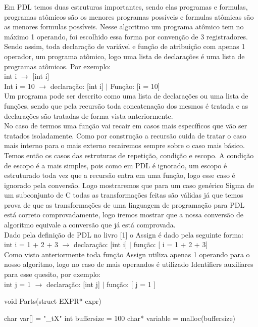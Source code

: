 \documentclass{article}
\begin{document}
Em PDL temos duas estruturas importantes, sendo elas programas e formulas, programas atômicos são os menores programas possíveis e formulas atômicas são as menores formulas possíveis. Nesse algoritmo um programa atômico tem no máximo 1 operando, foi escolhido essa forma por convenção de 3 registradores. Sendo assim, toda declaração de variável e função de atribuição com apenas 1 operador, um programa atômico, logo uma lista de declarações é uma lista de programas atômicos. Por exemplo:\\
\BlankLine
int i $\rightarrow$ [int i] \\
\BlankLine
Int i = 10 $\rightarrow$ declaração: [int i] $|$ Função: [i = 10] \\
\BlankLine
Um programa pode ser descrito como uma lista de declarações ou uma lista de funções, sendo que pela recursão toda concatenação dos mesmos é tratada e as declarações são tratadas de forma vista anteriormente. \\
\BlankLine
No caso de termos uma função vai recair em casos mais específicos que vão ser tratados isoladamente. Como por construção a recursão cuida de tratar o caso mais interno para o mais externo recairemos sempre sobre o caso mais básico. Temos então os casos das estruturas de repetição, condição e escopo. A condição de escopo é a mais simples, pois como em PDL é ignorado, um escopo é estruturado toda vez que a recursão entra em uma função, logo esse caso é ignorado pela conversão. Logo mostraremos que para um caso genérico Sigma de um subconjunto de C todas as transformações feitas são válidas já que temos prova de que as transformações de uma linguagem de programação para PDL está correto comprovadamente, logo iremos mostrar que a nossa conversão de algoritmo equivale a conversão que já está comprovada.\\
\BlankLine
Dado pela definição de PDL no livro [1] o Assign é dado pela seguinte forma:\\
\BlankLine
int i = 1 + 2 + 3 $\rightarrow$ declaração: [int i] $|$ função: [ i = 1 + 2 + 3]\\
\BlankLine
Como visto anteriormente toda função Assign utiliza apenas 1 operando para o nosso algoritmo, logo no caso de mais operandos é utilizado Identifiers auxiliares para esse quesito, por exemplo:\\
\BlankLine
int j = 1 $\rightarrow$ declaração: [int j] $|$ função: [ j = 1 ] \\
\BlankLine

\begin{algorithm}
	\caption{void Parts(struct EXPR* expr)}
	
	char var[] = "\_tX"\;
	int buffersize = 100\;
	char* variable = malloc(buffersize)\;
	
\end{algorithm}
\end{document}
